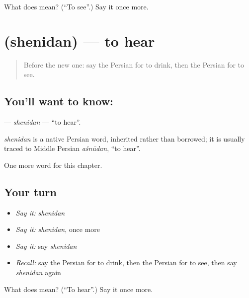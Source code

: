 \begin{tcolorbox}[breakable,colback=teal!4,colframe=teal!35!black,title={Before you move on}]
What does  mean? (\textquotedblleft{}To see\textquotedblright{}.) Say it once more.
\end{tcolorbox}
\section[\texorpdfstring{\fa{شنیدن} (shenidan)}{شنیدن (shenidan)}]{ (shenidan) — to hear}

\label{lesson:FA-C35-shenidan}



\begin{quote}
Before the new one: say the Persian for to drink, then the Persian for to see.
\end{quote}

\subsection*{You'll want to know: }
\textbf{} — \emph{shenidan} — \textquotedblleft{}to hear\textquotedblright{}.

\begin{cousinweb}
\emph{shenidan} is a native Persian word, inherited rather than borrowed; it is usually traced to Middle Persian \emph{ašnūdan}, \textquotedblleft{}to hear\textquotedblright{}.
\end{cousinweb}

\begin{grammarlens}[title={What you've built}]
One more word for this chapter.
\end{grammarlens}

\subsection*{Your turn}
\begin{itemize}
\raggedright
  \item \emph{Say it:} \emph{shenidan}
  \item \emph{Say it:} \emph{shenidan}, once more
  \item \emph{Say it:} say \emph{shenidan}
  \item \emph{Recall:} say the Persian for to drink, then the Persian for to see, then say \emph{shenidan} again
\end{itemize}

\begin{tcolorbox}[breakable,colback=teal!4,colframe=teal!35!black,title={Before you move on}]
What does  mean? (\textquotedblleft{}To hear\textquotedblright{}.) Say it once more.
\end{tcolorbox}
